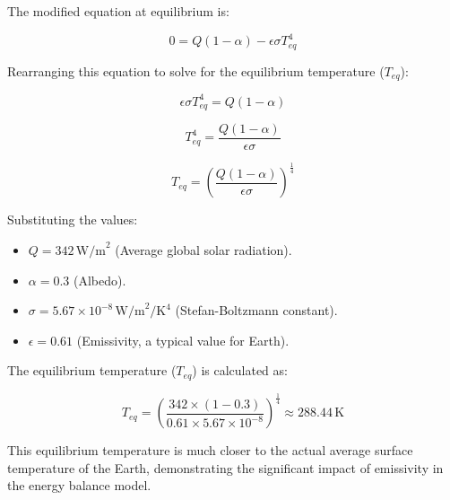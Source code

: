 \documentclass[12pt]{article}
\begin{document}
The modified equation at equilibrium is:

\begin{equation}
0 = Q(1 - \alpha) - \epsilon\sigma T_{eq}^4
\end{equation}

Rearranging this equation to solve for the equilibrium temperature ($T_{eq}$):

\begin{equation}
\epsilon\sigma T_{eq}^4 = Q(1 - \alpha)
\end{equation}

\begin{equation}
T_{eq}^4 = \frac{Q(1 - \alpha)}{\epsilon\sigma}
\end{equation}

\begin{equation}
T_{eq} = \left( \frac{Q(1 - \alpha)}{\epsilon\sigma} \right)^{\frac{1}{4}}
\end{equation}

Substituting the values:
\begin{itemize}
    \item $Q = 342 \, \text{W/m}^2$ (Average global solar radiation).
    \item $\alpha = 0.3$ (Albedo).
    \item $\sigma = 5.67 \times 10^{-8} \, \text{W/m}^2/\text{K}^4$ (Stefan-Boltzmann constant).
    \item $\epsilon = 0.61$ (Emissivity, a typical value for Earth).
\end{itemize}

The equilibrium temperature ($T_{eq}$) is calculated as:

\begin{equation}
T_{eq} = \left( \frac{342 \times (1 - 0.3)}{0.61 \times 5.67 \times 10^{-8}} \right)^{\frac{1}{4}} \approx 288.44 \, \text{K}
\end{equation}

This equilibrium temperature is much closer to the actual average surface temperature of the Earth, demonstrating the significant impact of emissivity in the energy balance model.
\end{document}
